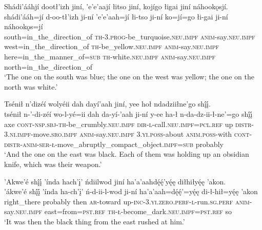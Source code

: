 \ea\label{ex:text4-4-6}
Shádi’ááhjí dootł’izh jiní, ’e’e’aají łitso jiní, kojígo łigai jiní náhookǫsjí.\\
\gll shádi’ááh=jí	d-oo-tł’izh	ji-ní	’e’e’aah=jí	łi-tso	ji-ní	ko=jí=go	łi-gai	ji-ní	náhookǫs=jí\\
     south=in\_the\_direction\_of	\textsc{th}-3.\textsc{prog}-be\_turquoise.\textsc{neu}.\textsc{impf}	\textsc{anim}-say.\textsc{neu}.\textsc{impf}	west=in\_the\_direction\_of	\textsc{th}-be\_yellow.\textsc{neu}.\textsc{impf}	\textsc{anim}-say.\textsc{neu}.\textsc{impf}	here=in\_the\_manner\_of=\textsc{sub}	\textsc{th}-white.\textsc{neu}.\textsc{impf}	\textsc{anim}-say.\textsc{neu}.\textsc{impf}	north=in\_the\_direction\_of\\
\glt `The one on the south was blue; the one on the west was yellow; the one on the north was white.'
\z

\ea\label{ex:text4-4-7}
Tsénił n’dizéí wolyéii dah dayí’aah jiní, yee hoł ndadziiłne’go shį́į́.\\
\gll tsénił	n-’-di-zéí	wo-l-yé=ii	dah	da-yí-’aah	ji-ní	y-ee	ha-ł	n-da-dz-ii-ł-ne’=go	shį́į́\\
     axe	\textsc{cont}-\textsc{nsp}.\textsc{sbj}-\textsc{th}-be\_crumbly.\textsc{neu}.\textsc{impf}	\textsc{dir}-\textsc{l}-call.\textsc{neu}.\textsc{impf}=\textsc{pcl}.\textsc{ref}	up	\textsc{distr}-3.\textsc{ni}.\textsc{impf}-move.\textsc{sro}.\textsc{impf}	\textsc{anim}-say.\textsc{neu}.\textsc{impf}	3.\textsc{yi}.\textsc{poss}-about	\textsc{anim}.\textsc{poss}-with	\textsc{cont}-\textsc{distr}-\textsc{anim}-\textsc{ser}-\textsc{ł}-move\_abruptly\_compact\_object.\textsc{impf}=\textsc{sub}	probably\\
\glt `And the one on the east was black. Each of them was holding up an obsidian knife, which was their weapon.'
\z

\ea\label{ex:text4-4-8}
’Akwe’é shį́į́ ’índa hach’į’ ńdiilwod jiní ha’a’aahdę́ę́’yę́ę diłhiłyę́ę ’akon.\\
\gll ’ákwe’é	shį́į́	’índa	ha-ch’į’	ń-d-ii-l-wod	ji-ní	ha’a’aah=dę́ę́’=yę́ę	di-ł-hił=yę́ę	’akon\\
     right\_there	probably	then	\textsc{ar}-toward	up-\textsc{inc}-3.\textsc{yi}.\textsc{zero}.\textsc{perf}-\textsc{l}-run.\textsc{sg}.\textsc{perf}	\textsc{anim}-say.\textsc{neu}.\textsc{impf}	east=from=\textsc{pst}.\textsc{ref}	\textsc{th}-\textsc{ł}-become\_dark.\textsc{neu}.\textsc{impf}=\textsc{pst}.\textsc{ref}	so\\
\glt `It was then the black thing from the east rushed at him.'
\z

